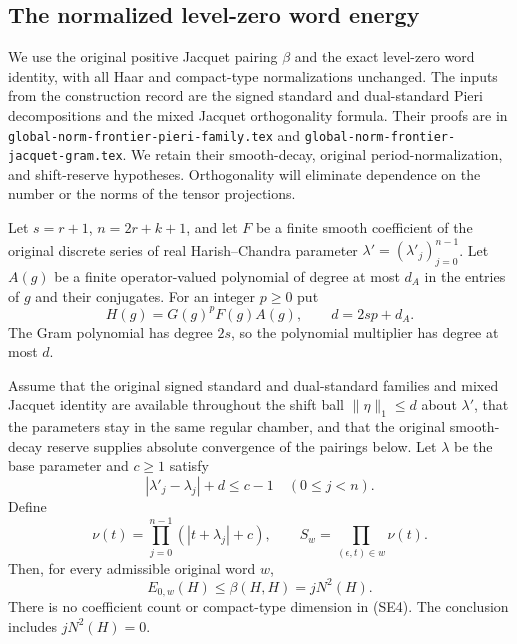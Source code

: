 \subsection{The normalized level-zero word energy}
\label{sec:archimedean-spectral-word-energy}

We use the original positive Jacquet pairing \(\beta\) and the
exact level-zero word identity, with all Haar and compact-type
normalizations unchanged. The inputs from the construction record
are the signed standard and dual-standard Pieri decompositions
and the mixed Jacquet orthogonality formula. Their proofs are in
\texttt{global-norm-frontier-pieri-family.tex} and
\texttt{global-norm-frontier-jacquet-gram.tex}.\cite{current-construction-record}
We retain their smooth-decay, original period-normalization, and
shift-reserve hypotheses. Orthogonality will eliminate dependence
on the number or the norms of the tensor projections.

Let \(s=r+1\), \(n=2r+k+1\), and let \(F\) be a finite smooth
coefficient of the original discrete series of real
Harish--Chandra parameter \(\lambda'=(\lambda'_j)_{j=0}^{n-1}\).
Let \(A(g)\) be a finite operator-valued polynomial of degree at
most \(d_A\) in the entries of \(g\) and their conjugates.
For an integer \(p\ge0\) put
\[
                  H(g)=G(g)^pF(g)A(g),\qquad
                         d=2sp+d_A .                  \tag{SE1}
\]
The Gram polynomial has degree \(2s\), so the polynomial
multiplier has degree at most \(d\).

\begin{theorem}
\label{thm:archimedean-spectral-word-energy}
Assume that the original signed standard and dual-standard
families and mixed Jacquet identity are available throughout
the shift ball \(\|\eta\|_1\le d\) about \(\lambda'\), that
the parameters stay in the same regular chamber, and that the
original smooth-decay reserve supplies absolute convergence of
the pairings below. Let \(\lambda\) be the base parameter and
\(c\ge1\) satisfy
\[
                  |\lambda'_j-\lambda_j|+d\le c-1
                      \quad(0\le j<n).
                                                        \tag{SE2}
\]
Define
\[
 \nu(t)=\prod_{j=0}^{n-1}(|t+\lambda_j|+c),\qquad
                 S_w=\prod_{(\epsilon,t)\in w}\nu(t).
                                                        \tag{SE3}
\]
Then, for every admissible original word \(w\),
\[
                      E_{0,w}(H)\le\beta(H,H)=jN^2(H).
                                                        \tag{SE4}
\]
There is no coefficient count or compact-type dimension in
(SE4). The conclusion includes \(jN^2(H)=0\).
\end{theorem}

